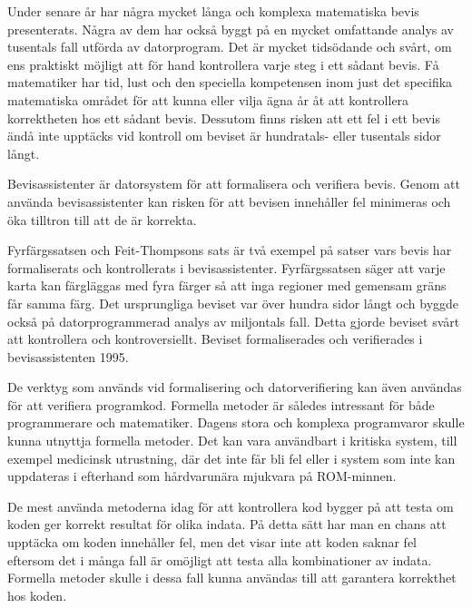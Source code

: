 Under senare år har några mycket långa och komplexa matematiska bevis
presenterats. Några av dem har också byggt på en mycket omfattande analys av
tusentals fall utförda av datorprogram. Det är mycket tidsödande och svårt, om
ens praktiskt möjligt att för hand kontrollera varje steg i ett sådant bevis.
Få matematiker har tid, lust och den speciella kompetensen inom just det
specifika matematiska området för att kunna eller vilja ägna år åt att
kontrollera korrektheten hos ett sådant bevis. Dessutom finns risken att ett
fel i ett bevis ändå inte upptäcks vid kontroll om beviset är hundratals- eller
tusentals sidor långt\cite{harrison2008formal}.

Bevisassistenter är datorsystem för att formalisera och verifiera bevis. Genom
att använda bevisassistenter kan risken för att bevisen innehåller fel
minimeras och öka tilltron till att de är korrekta.

Fyrfärgssatsen\cite{gonthier2008formal} och Feit-Thompsons
sats\cite{aschbacher2004status} är två exempel på satser vars bevis har
formaliserats och kontrollerats i bevisassistenter. Fyrfärgssatsen säger att
varje karta kan färgläggas med fyra färger så att inga regioner med gemensam
gräns får samma färg. Det ursprungliga beviset var över hundra sidor långt och
byggde också på datorprogrammerad analys av miljontals fall. Detta gjorde
beviset svårt att kontrollera och kontroversiellt. Beviset formaliserades och
verifierades i bevisassistenten \coq{} 1995.

De verktyg som används vid formalisering och datorverifiering kan även användas
för att verifiera programkod. Formella metoder är således intressant för både
programmerare och matematiker. Dagens stora och komplexa programvaror skulle
kunna utnyttja formella metoder. Det kan vara användbart i kritiska system,
till exempel medicinsk utrustning, där det inte får bli fel eller i system som
inte kan uppdateras i efterhand som hårdvarunära mjukvara på ROM-minnen.

De mest använda metoderna idag för att kontrollera kod bygger på att testa om
koden ger korrekt resultat för olika indata. På detta sätt har man en chans att
upptäcka om koden innehåller fel, men det visar inte att koden saknar fel
eftersom det i många fall är omöjligt att testa alla kombinationer av indata.
Formella metoder skulle i dessa fall kunna användas till att garantera
korrekthet hos koden.

